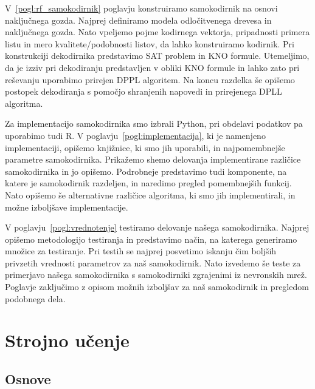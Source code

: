 \documentclass[12pt,a4paper,twoside]{article}
\theoremstyle{definition} %
\theoremstyle{plain} %
\numberwithin{equation}{section}  %
\begin{document}
V~\ref{pogl:rf_samokodirnik} poglavju konstruiramo samokodirnik na osnovi naključnega gozda.
Najprej definiramo modela odločitvenega drevesa in naključnega gozda.
Nato vpeljemo pojme kodirnega vektorja, pripadnosti primera listu in mero kvalitete/\-podobnosti listov, da lahko konstruiramo kodirnik.
Pri konstrukciji dekodirnika predstavimo SAT problem in KNO formule. 
Utemeljimo, da je izziv pri dekodiranju predstavljen v obliki KNO formule in lahko zato pri reševanju uporabimo prirejen DPPL algoritem.
Na koncu razdelka še opišemo postopek dekodiranja s pomočjo shranjenih napovedi in prirejenega DPLL algoritma.

Za implementacijo samokodirnika smo izbrali Python, pri obdelavi podatkov pa uporabimo tudi R.
V poglavju~\ref{pogl:implementacija}, ki je namenjeno implementaciji, opišemo knjižnice, ki smo jih uporabili, in najpomembnejše parametre samokodirnika.
Prikažemo shemo delovanja implementirane različice samokodirnika in jo opišemo.
Podrobneje predstavimo tudi komponente, na katere je samokodirnik razdeljen, in naredimo pregled pomembnejših funkcij.
Nato opišemo še alternativne različice algoritma, ki smo jih implementirali, in možne izboljšave implementacije.

V poglavju~\ref{pogl:vrednotenje} testiramo delovanje našega samokodirnika.
Najprej opišemo metodologijo testiranja in predstavimo način, na katerega generiramo množice za testiranje.
Pri testih se najprej posvetimo iskanju čim boljših privzetih vrednosti parametrov za naš samokodirnik.
Nato izvedemo še teste za primerjavo našega samokodirnika s samokodirniki zgrajenimi iz nevronskih mrež.
Poglavje zaključimo z opisom možnih izboljšav za naš samokodirnik in pregledom podobnega dela.


\section{Strojno učenje}
\label{pogl:strojno_ucenje}

\subsection{Osnove}
\end{document}
